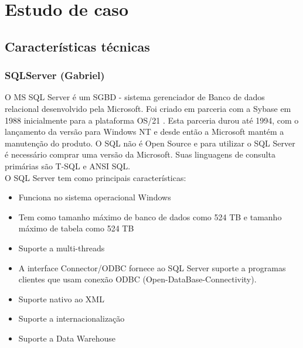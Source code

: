 \documentclass[conference]{IEEEtran}
\begin{document}
\section{Estudo de caso}
  \subsection{Características técnicas}
    \subsubsection{SQLServer (Gabriel)}
O MS SQL Server é um SGBD - sistema gerenciador de Banco de dados relacional desenvolvido pela Microsoft. Foi criado em parceria com a Sybase em 1988 inicialmente para a plataforma OS/21 . Esta parceria durou até 1994, com o lançamento da versão para Windows NT e desde então a Microsoft mantém a manutenção do produto. O SQL não é Open Source e para utilizar o SQL Server é necessário comprar uma versão da Microsoft. Suas linguagens de consulta primárias são T-SQL e ANSI SQL.\\
	O SQL Server tem como principais características:
\begin{itemize}
\item Funciona no sistema operacional Windows
\item Tem como tamanho máximo de banco de dados como 524 TB  e tamanho máximo de tabela como 524 TB
\item Suporte a multi-threads
\item A interface Connector/ODBC fornece ao SQL Server suporte a programas clientes que usam conexão ODBC (Open-DataBase-Connectivity).
\item Suporte nativo ao XML
\item Suporte a internacionalização
\item Suporte a Data Warehouse
\end{itemize}
\end{document}
